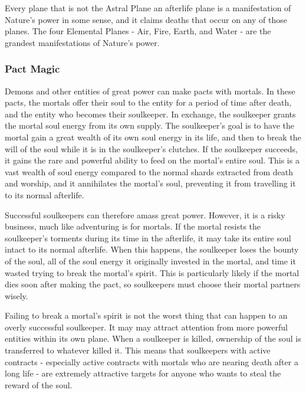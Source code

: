            Every plane that is not the Astral Plane an afterlife plane is a manifestation of Nature's power in some sense, and it claims deaths that occur on any of those planes.
            The four Elemental Planes - Air, Fire, Earth, and Water - are the grandest manifestations of Nature's power.

        \subsubsection{Pact Magic}
            Demons and other entities of great power can make pacts with mortals.
            In these pacts, the mortals offer their soul to the entity for a period of time after death, and the entity who becomes their soulkeeper.
            In exchange, the soulkeeper grants the mortal soul energy from its own supply.
            The soulkeeper's goal is to have the mortal gain a great wealth of its own soul energy in its life, and then to break the will of the soul while it is in the soulkeeper's clutches.
            If the soulkeeper succeeds, it gains the rare and powerful ability to feed on the mortal's entire soul.
            This is a vast wealth of soul energy compared to the normal shards extracted from death and worship, and it annihilates the mortal's soul, preventing it from travelling it to its normal afterlife.

            Successful soulkeepers can therefore amass great power.
            However, it is a risky business, much like adventuring is for mortals.
            If the mortal resists the soulkeeper's torments during its time in the afterlife, it may take its entire soul intact to its normal afterlife.
            When this happens, the soulkeeper loses the bounty of the soul, all of the soul energy it originally invested in the mortal, and time it wasted trying to break the mortal's spirit.
            This is particularly likely if the mortal dies soon after making the pact, so soulkeepers must choose their mortal partners wisely.

            Failing to break a mortal's spirit is not the worst thing that can happen to an overly successful soulkeeper.
            It may may attract attention from more powerful entities within its own plane.
            When a soulkeeper is killed, ownership of the soul is transferred to whatever killed it.
            This means that soulkeepers with active contracts - especially active contracts with mortals who are nearing death after a long life - are extremely attractive targets for anyone who wants to steal the reward of the soul.

